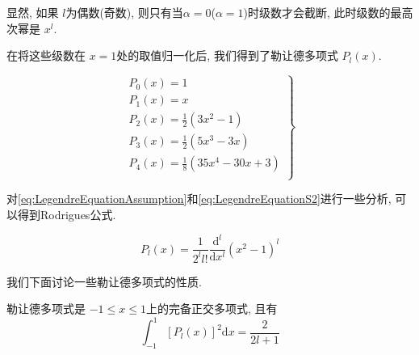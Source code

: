 显然, 如果 $l$为偶数(奇数), 则只有当$\alpha=0$($\alpha=1$)时级数才会截断, 此时级数的最高次幂是 $x^l$.

在将这些级数在 $x=1$处的取值归一化后, 我们得到了勒让德多项式 $P_l(x)$.

\begin{equation}
    \left.
        \begin{array}{l}
            P_0(x) = 1\\
            P_1(x) = x\\
            P_2(x) = \frac{1}{2}(3x^{2}-1)\\
            P_3(x) = \frac{1}{2}(5x^3-3x)\\
            P_4(x) = \frac{1}{8}(35x^4-30x+3)\\
        \end{array}
    \right\}
\end{equation}

对\cref{eq:LegendreEquationAssumption}和\cref{eq:LegendreEquationS2}进行一些分析, 可以得到Rodrigues公式.

\begin{theorem}[Rodrigues公式]
    \begin{equation}
        P_l(x) = \frac{1}{2^ll!}\frac{\mathrm{d}^l}{\mathrm{d}x^l}(x^2-1)^l \label{eq:RodriguesFormula}
    \end{equation}
\end{theorem}

我们下面讨论一些勒让德多项式的性质.
\begin{theorem}
    勒让德多项式是 $-1\le x\le 1$上的完备正交多项式, 且有
    \begin{equation}
        \int_{-1}^1 [P_l(x)]^2 \mathrm{d}x = \frac{2}{2l+1}
    \end{equation}
\end{theorem}

